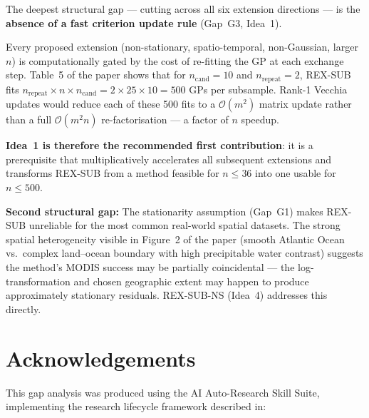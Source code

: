 \documentclass[12pt, a4paper]{article}
\begin{document}
\begin{critbox}[title=\textbf{The Single Highest-Leverage Gap}]

The deepest structural gap --- cutting across all six extension directions --- is
the \textbf{absence of a fast criterion update rule} (Gap~G3, Idea~1).

Every proposed extension (non-stationary, spatio-temporal, non-Gaussian, larger $n$)
is computationally gated by the cost of re-fitting the GP at each exchange step.
Table~5 of the paper shows that for $n_{\text{cand}} = 10$ and
$n_{\text{repeat}} = 2$, REX-SUB fits
$n_{\text{repeat}} \times n \times n_{\text{cand}} = 2 \times 25 \times 10 = 500$
GPs per subsample.  Rank-1 Vecchia updates would reduce each of these 500 fits to a
$\mathcal{O}(m^2)$ matrix update rather than a full $\mathcal{O}(m^2 n)$
re-factorisation --- a factor of $n$ speedup.

\textbf{Idea~1 is therefore the recommended first contribution}: it is a prerequisite
that multiplicatively accelerates all subsequent extensions and transforms REX-SUB
from a method feasible for $n \leq 36$ into one usable for $n \leq 500$.

\end{critbox}

\medskip

\begin{warnbox}
  \textbf{Second structural gap:}
  The stationarity assumption (Gap~G1) makes REX-SUB unreliable for the most common
  real-world spatial datasets.  The strong spatial heterogeneity visible in Figure~2
  of the paper (smooth Atlantic Ocean vs.\ complex land--ocean boundary with high
  precipitable water contrast) suggests the method's MODIS success may be partially
  coincidental --- the log-transformation and chosen geographic extent may happen to
  produce approximately stationary residuals.  REX-SUB-NS (Idea~4) addresses this
  directly.
\end{warnbox}

\section*{Acknowledgements}

This gap analysis was produced using the AI Auto-Research Skill Suite, implementing
the research lifecycle framework described in:
\end{document}
